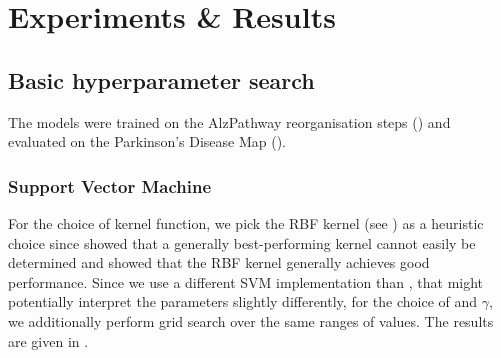 \documentclass[
	fontsize=10pt, %
	twoside=false, %
	secnumdepth=1, %
]{kaobook}
\begin{document}



\chapter{Experiments \& Results}
\label{sec:experiments-results}









\section{Basic hyperparameter search}

The models were trained on the AlzPathway reorganisation steps (\ADMap)
and evaluated on the Parkinson's Disease Map (\PDMap). 

\subsection{Support Vector Machine}

For the choice of kernel function, we pick the RBF kernel (see
) as a heuristic choice since
\citeauthor{nielsen_MachineLearningSupport_2019} showed that a generally
best-performing kernel cannot easily be determined and showed that the RBF
kernel generally achieves good performance.
%
Since we use a different SVM implementation than \nielsen, that might
potentially interpret the parameters slightly differently, for the choice of
 and $\gamma$, we additionally perform grid search over the same ranges
of values.
%
The results are given in
.
\end{document}
